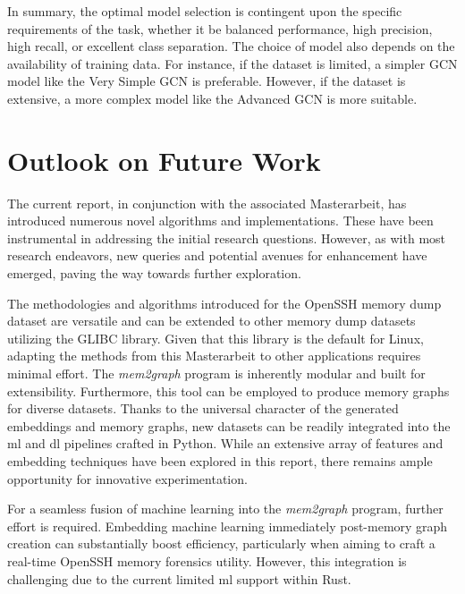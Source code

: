 In summary, the optimal model selection is contingent upon the specific requirements of the task, whether it be balanced performance, high precision, high recall, or excellent class separation. The choice of model also depends on the availability of training data. For instance, if the dataset is limited, a simpler GCN model like the Very Simple GCN is preferable. However, if the dataset is extensive, a more complex model like the Advanced GCN is more suitable. 

\section{Outlook on Future Work}\label{conclusion:sec:future_work}


The current report, in conjunction with the associated Masterarbeit, has introduced numerous novel algorithms and implementations. These have been instrumental in addressing the initial research questions. However, as with most research endeavors, new queries and potential avenues for enhancement have emerged, paving the way towards further exploration.

The methodologies and algorithms introduced for the OpenSSH memory dump dataset are versatile and can be extended to other memory dump datasets utilizing the GLIBC library. Given that this library is the default for Linux, adapting the methods from this Masterarbeit to other applications requires minimal effort. The \textit{mem2graph} program is inherently modular and built for extensibility. Furthermore, this tool can be employed to produce memory graphs for diverse datasets. Thanks to the universal character of the generated embeddings and memory graphs, new datasets can be readily integrated into the \acrshort{ml} and \acrshort{dl} pipelines crafted in Python. While an extensive array of features and embedding techniques have been explored in this report, there remains ample opportunity for innovative experimentation.

For a seamless fusion of machine learning into the \textit{mem2graph} program, further effort is required. Embedding machine learning immediately post-memory graph creation can substantially boost efficiency, particularly when aiming to craft a real-time OpenSSH memory forensics utility. However, this integration is challenging due to the current limited \acrshort{ml} support within Rust.

